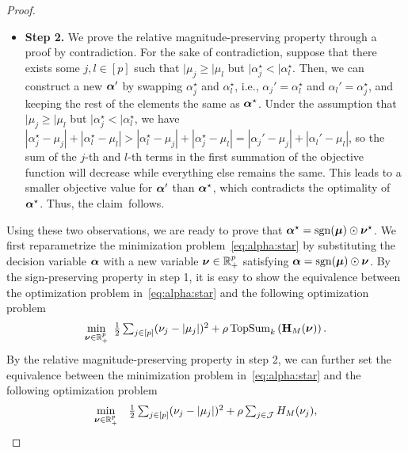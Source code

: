 \begin{proof}
\begin{itemize}[label=$\diamond$,leftmargin=*]
        \item \textbf{Step 2.} We prove the relative magnitude-preserving property through a proof by contradiction. For the sake of contradiction, suppose that there exists some $j, l \in [p]$ such that $\vert{\mu_j} \geq \vert{\mu_l}$ but $\vert{\alpha_j^\star} < \vert{\alpha_l^\star}$.
        Then, we can construct a new $\bm{\alpha}'$ by swapping $\alpha_j^\star$ and $\alpha_l^\star$, i.e., $\alpha_j' = \alpha_l^\star$ and $\alpha_l' = \alpha_j^\star$, and keeping the rest of the elements the same as $\bm{\alpha}^\star$.
        Under the assumption that $\vert{\mu_j} \geq \vert{\mu_l}$ but $\vert{\alpha_j^\star} < \vert{\alpha_l^\star}$, we have $\left\lvert{\alpha_j^\star - \mu_j}\right\rvert + \left\lvert{\alpha_l^\star - \mu_l}\right\rvert > \left\lvert{\alpha_l^\star - \mu_j}\right\rvert + \left\lvert{\alpha_j^\star - \mu_l}\right\rvert =
        \left\lvert{\alpha_j' - \mu_j}\right\rvert + \left\lvert{\alpha_l' - \mu_l}\right\rvert$, so the sum of the $j$-th and $l$-th terms in the first summation of the objective function will decrease while everything else remains the same.
        This leads to a smaller objective value for $\bm{\alpha}'$ than $\bm{\alpha}^\star$, which contradicts the optimality of $\bm{\alpha}^\star$. Thus, the claim~follows.
    \end{itemize}
    Using these two observations, we are ready to prove that $\bm{\alpha}^\star = \operatorname{sgn}(\bm{\mu}) \odot \bm{\nu}^\star$.
    We first reparametrize the minimization problem~\eqref{eq:alpha:star} by substituting the decision variable $\bm{\alpha}$ with a new variable $\bm{\nu} \in \mathbb{R}_+^p$ satisfying $\bm{\alpha} = \operatorname{sgn}(\bm{\mu}) \odot \bm{\nu}$. By the sign-preserving property in step 1, it is easy to show the equivalence between the optimization problem in~\eqref{eq:alpha:star} and the following optimization problem
    \begin{align*}
        \min_{\bm{\nu} \in \mathbb{R}^p_+} ~ \textstyle \frac{1}{2} \sum_{j \in [p]} (\nu_j - \lvert \mu_j \rvert)^2 + \rho \operatorname{TopSum}_k \left( \mathbf{H}_M ( \bm{\nu} ) \right).
    \end{align*}
    By the relative magnitude-preserving property in step 2, we can further set the equivalence between the minimization problem in~\eqref{eq:alpha:star} and the following optimization problem
    \begin{align*}
        \begin{array}{cl}
            \displaystyle \min_{\bm{\nu} \in \mathbb{R}_+^p} & \frac{1}{2} \sum_{j \in [p]} (\nu_j - \lvert \mu_j \rvert)^2 + \rho \sum_{j \in \mathcal{J}} H_M (\nu_j), \\ 

\end{array}
\end{align*}
\end{proof}
